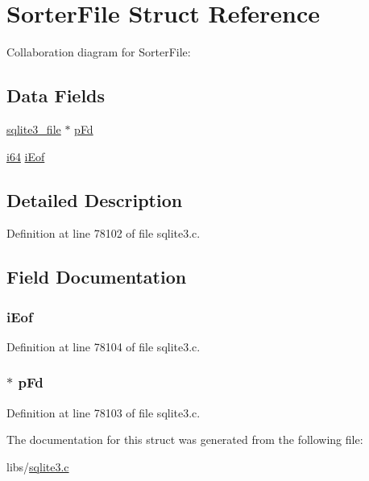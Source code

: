 \hypertarget{struct_sorter_file}{}\section{Sorter\+File Struct Reference}
\label{struct_sorter_file}


Collaboration diagram for Sorter\+File\+:
\subsection*{Data Fields}
\begin{DoxyCompactItemize}
\item 
\hyperlink{structsqlite3__file}{sqlite3\+\_\+file} $\ast$ \hyperlink{struct_sorter_file_ae44362cf35caac454319be8c145e374e}{p\+Fd}
\item 
\hyperlink{sqlite3_8c_a2a0f0f4ae7001eb54351f77ea1cdbcfd}{i64} \hyperlink{struct_sorter_file_ae2045ce697bd581b187644cebea747cf}{i\+Eof}
\end{DoxyCompactItemize}


\subsection{Detailed Description}


Definition at line 78102 of file sqlite3.\+c.



\subsection{Field Documentation}
\hypertarget{struct_sorter_file_ae2045ce697bd581b187644cebea747cf}{}
\subsubsection[{i\+Eof}]{ i\+Eof}\label{struct_sorter_file_ae2045ce697bd581b187644cebea747cf}


Definition at line 78104 of file sqlite3.\+c.

\hypertarget{struct_sorter_file_ae44362cf35caac454319be8c145e374e}{}
\subsubsection[{p\+Fd}]{$\ast$ p\+Fd}\label{struct_sorter_file_ae44362cf35caac454319be8c145e374e}


Definition at line 78103 of file sqlite3.\+c.



The documentation for this struct was generated from the following file\+:\begin{DoxyCompactItemize}
\item 
libs/\hyperlink{sqlite3_8c}{sqlite3.\+c}\end{DoxyCompactItemize}
